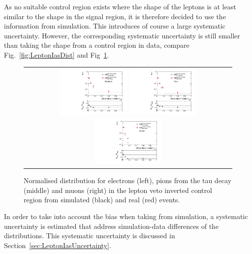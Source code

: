 As no suitable control region exists where the \ias shape of the leptons is at least similar to the shape in the signal region, it is therefore decided to use the \ias information from simulation.
This introduces of course a large systematic uncertainty.
However, the corresponding systematic uncertainty is still smaller than taking the \ias shape from a control region in data, compare Fig.~\ref{fig:LeptonIasDist} and Fig~\ref{fig:LeptonIasDistData}.
\begin{figure}[!tb]
  \centering 
  \begin{tabular}{c}
    \includegraphics[width=0.33\textwidth]{figures/analysis/Background/hASmi_Electrons_MCCR_DataCR.pdf}
    \includegraphics[width=0.33\textwidth]{figures/analysis/Background/hASmi_Taus_MCCR_DataCR.pdf}
    \includegraphics[width=0.33\textwidth]{figures/analysis/Background/hASmi_Muons_MCCR_DataCR.pdf}
  \end{tabular}
  \caption{Normalised \ias distribution for electrons (left), pions from the tau decay (middle) and muons (right) in the lepton veto inverted control region from simulated (black) and real (red) events.}
  \label{fig:LeptonIasDistData}
\end{figure}

In order to take into account the bias when taking \ias from simulation, a systematic uncertainty is estimated that address simulation-data differences of the \ias distributions.
This systematic uncertainty is discussed in Section~\ref{sec:LeptonIasUncertainty}.
